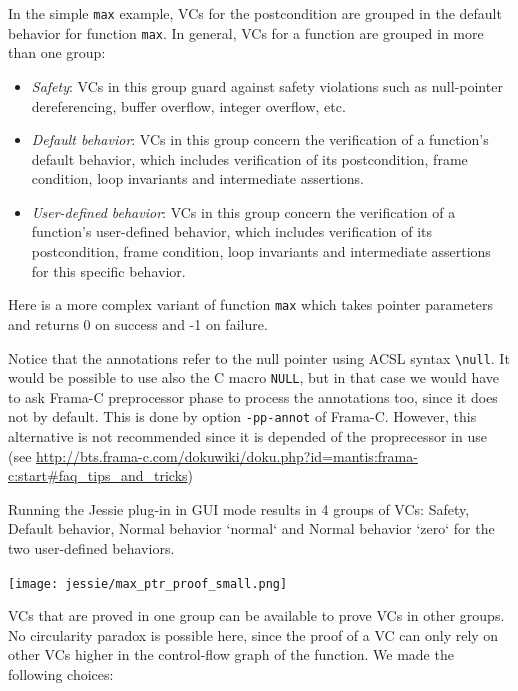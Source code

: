 \documentclass[a4paper,11pt,twoside,openright]{report}
\begin{document}
In the simple \verb|max| example, VCs for the postcondition are grouped
in the default behavior for function \verb|max|. In general, VCs for a
function are grouped in more than one group:

\begin{itemize}
\item \textit{Safety}: VCs in this group guard against safety violations
  such as null-pointer dereferencing, buffer overflow, integer overflow, etc.
\item \textit{Default behavior}: VCs in this group concern the
  verification of a function's default behavior, which includes
  verification of its postcondition, frame condition, loop invariants
  and intermediate assertions.
\item \textit{User-defined behavior}: VCs in this group concern the
  verification of a function's user-defined behavior, which includes
  verification of its postcondition, frame condition, loop invariants
  and intermediate assertions for this specific behavior.
\end{itemize}

Here is a more complex variant of function \verb|max| which takes
pointer parameters and returns 0 on success and -1 on failure.



Notice that the annotations refer to the null pointer using ACSL
syntax \verb|\null|. It would be possible to use also the C macro
\texttt{NULL}, but in that case we would have to ask Frama-C
preprocessor phase to process the annotations too, since it does not
by default. This is done by option \verb|-pp-annot| of
Frama-C. However, this alternative is not recommended since it is
depended of the proprecessor in use (see \url{http://bts.frama-c.com/dokuwiki/doku.php?id=mantis:frama-c:start#faq_tips_and_tricks})

Running the Jessie plug-in in GUI mode results in 4 groups of VCs:
Safety, Default behavior, Normal behavior `normal` and Normal behavior
`zero` for the two user-defined behaviors.

\begin{center}
  \texttt{[image: jessie/max\_ptr\_proof\_small.png]}
\end{center}

VCs that are proved in one group can be available to prove VCs in other
groups. No circularity paradox is possible here, since the proof of a
VC can only rely on other VCs higher in the control-flow graph of the
function. We made the following choices:
\end{document}
